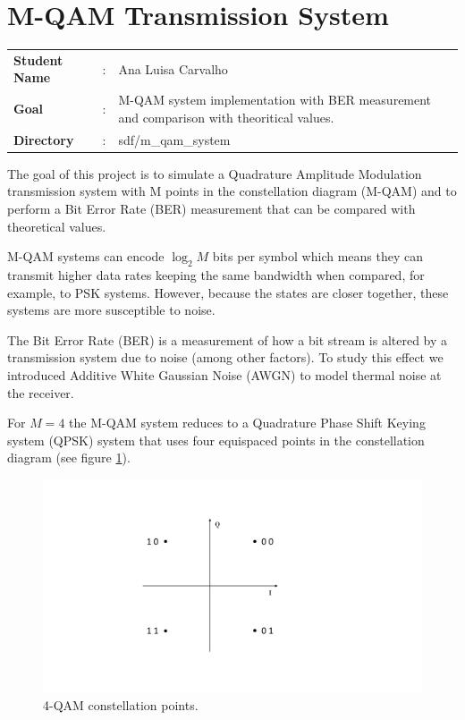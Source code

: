 \clearpage
\section{M-QAM Transmission System}

\begin{tcolorbox}	
	\begin{tabular}{p{2.75cm} p{0.2cm} p{10.5cm}} 	
		\textbf{Student Name}  &:& Ana Luisa Carvalho\\
		\textbf{Goal}          &:& M-QAM system implementation with BER measurement and comparison with theoritical values.\\
		\textbf{Directory} &:& sdf/m\_qam\_system
	\end{tabular}
\end{tcolorbox}

The goal of this project is to simulate a Quadrature Amplitude Modulation transmission system with M points in the constellation diagram (M-QAM) and to perform a Bit Error Rate (BER) measurement that can be compared with theoretical values. 

M-QAM systems can encode $\log_2 M$ bits per symbol which means they can transmit higher data rates keeping the same bandwidth when compared, for example, to PSK systems. However, because the states are closer together, these systems are more susceptible to noise.

The Bit Error Rate (BER) is a measurement of how a bit stream is altered by a transmission system due to noise (among other factors). To study this effect we introduced Additive White Gaussian Noise (AWGN) to model thermal noise at the receiver. 

For $M=4$ the M-QAM system reduces to a Quadrature Phase Shift Keying system (QPSK) system that uses four equispaced points in the constellation diagram (see figure \ref{fig:const}). 

\begin{figure}[h]
	\centering
	\includegraphics[clip, trim=2cm 3cm 3cm 3cm, width=\textwidth]{./sdf/m_qam_system/figures/MQAM_constellation.pdf}
	\caption{4-QAM constellation points.}
	\label{fig:const}
\end{figure}

